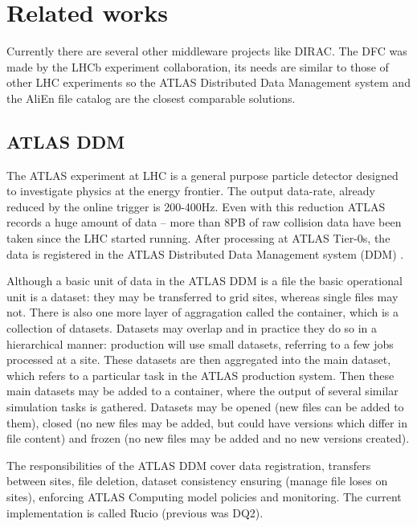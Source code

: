 \chapter{Related works}

Currently there are several other middleware projects like DIRAC. The DFC was made by the LHCb 
experiment collaboration, its needs are similar to those of other LHC experiments so the ATLAS Distributed 
Data Management system and the AliEn file catalog are the closest comparable solutions.


\section{ATLAS DDM}
The ATLAS experiment at LHC is a general purpose particle detector designed to investigate physics at the energy
frontier. The output data-rate, already reduced by the online trigger is  200-400Hz. Even with this reduction 
ATLAS records a huge amount of data – more than 8PB of raw collision data have been taken since the LHC
started running. After processing at ATLAS Tier-0s, the data is registered in the ATLAS Distributed Data Management
system (DDM) \cite{ATLASDDM1}.

Although a basic unit of data in the ATLAS DDM is a file the basic operational unit is a dataset: they may be
transferred to grid sites, whereas single files may not. There is also one more layer of aggragation called the 
container, which is a collection of datasets. Datasets may overlap and in practice they do so in a 
hierarchical manner: production will use small datasets, referring to a few jobs processed at a site. These datasets
are then aggregated into the main dataset, which refers to a particular task in the ATLAS
production system. Then these main datasets may be added to a container, where the output of several 
similar simulation tasks is gathered. Datasets may be opened (new files can be added to them), closed (no new files
may be added, but could have versions which differ in file content) and frozen (no new files may be added and no 
new versions created). 

The responsibilities of the ATLAS DDM cover data registration, transfers between sites, file deletion, dataset 
consistency ensuring (manage file loses on sites), enforcing ATLAS Computing model policies and monitoring. The
current implementation is called Rucio (previous was DQ2).


